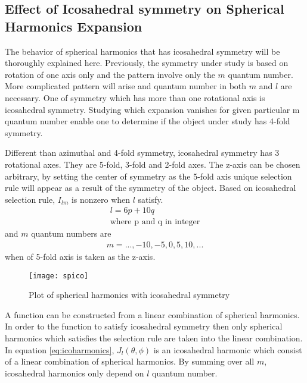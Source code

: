 \subsection{Effect of Icosahedral symmetry on Spherical Harmonics Expansion} \label{icosph}
The behavior of spherical harmonics that has icosahedral symmetry will be thoroughly explained here. Previously, the symmetry under study is based on rotation of one axis only and the pattern involve only the $m$ quantum number. More complicated pattern will arise and quantum number in both $m$ and $l$ are necessary. One of symmetry which has more than one rotational axis is icosahedral symmetry. Studying which expansion vanishes for given particular m quantum number enable one to determine if the object under study has 4-fold symmetry.

Different than azimuthal and 4-fold symmetry, icosahedral symmetry has 3 rotational axes. They are 5-fold, 3-fold and 2-fold axes. The z-axis can be chosen arbitrary, by setting the center of symmetry as the 5-fold axis unique selection rule will appear as a result of the symmetry of the object. Based on icosahedral selection rule\cite{norahcohan}, $I_{lm}$ is nonzero when $l$ satisfy. 
\begin{eqnarray}
l=6p+10q \\
\text{where p and q in integer} \nonumber
\end{eqnarray}
and $m$ quantum numbers are
\begin{eqnarray}
m=...,-10,-5,0,5,10,...
\end{eqnarray}
when of 5-fold axis is taken as the z-axis. 
\begin{figure}[h]
  \centering
  \texttt{[image: spico]}
\caption{Plot of spherical harmonics with icosahedral symmetry}
\label{fig:icosymsph}
\end{figure}
A function can be constructed from a linear combination of spherical harmonics. In order to the function to satisfy icosahedral symmetry then only spherical harmonics which satisfies the selection rule are taken into the linear combination. In equation \ref{eq:icoharmonics}, $J_{l}(\theta,\phi)$ is an icosahedral harmonic which consist of a linear combination of spherical harmonics. By summing over all $m$, icosahedral harmonics only depend on $l$ quantum number.  

